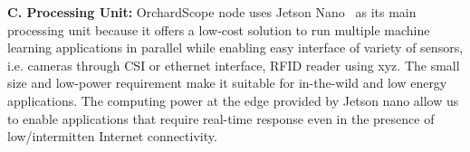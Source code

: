


\noindent
\textbf{C. Processing Unit:}
OrchardScope node uses Jetson Nano~\cite{jetson-nano} as its main processing unit because it offers a low-cost solution to run multiple machine learning applications in parallel while enabling easy interface of variety of sensors, i.e. cameras through CSI or ethernet interface, RFID reader using xyz. 
The small size and low-power requirement make it suitable for in-the-wild and low energy applications. The computing power at the edge provided by Jetson nano allow us to enable applications that require real-time response even in the presence of low/intermitten Internet connectivity. 

